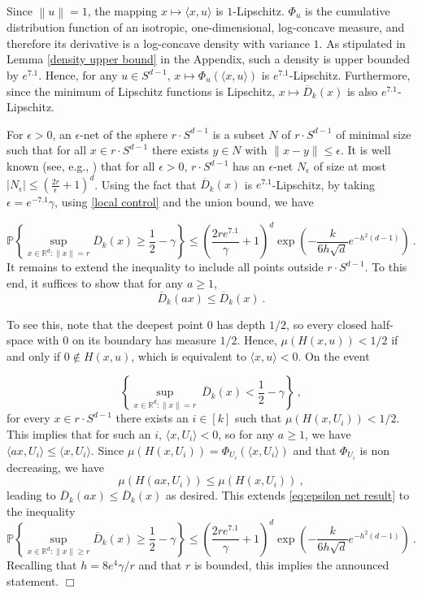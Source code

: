 \documentclass[12pt]{article}
\newcommand{\R}{\mathbb{R}}
\newcommand{\PP}{\mathbb{P}}
\newcommand{\ol}{\overline}
\newcommand{\qed}{\hfill $\Box$}
\newenvironment{proof}{\par\noindent{\bf Proof:}}{\qed \par\medskip\noindent}
\begin{document}
\begin{proof}
Since $\left\|u\right\|=1$, the mapping
$x\mapsto\langle x,u\rangle$ is $1$-Lipschitz. $\Phi_u$ is the
cumulative distribution function of an isotropic, one-dimensional,
log-concave measure, and therefore its derivative is a log-concave
density with variance $1$. As stipulated
in Lemma \ref{density upper bound} in the Appendix, such a density is upper bounded by
$e^{7.1}$. Hence, for any $u\in S^{d-1}$,
$x\mapsto \Phi_u(\langle x, u\rangle)$ is $e^{7.1}$-Lipschitz. Furthermore,
since the minimum of Lipschitz functions is Lipschitz,
$x\mapsto \ol{D}_k(x)$ is also $e^{7.1}$-Lipschitz.

For $\epsilon>0$, an $\epsilon$-net of the sphere $r\cdot S^{d-1}$ is
a subset $N$ of $r\cdot S^{d-1}$
of minimal size such that for all $x\in r\cdot S^{d-1}$ there exists $y \in
N$ with $\|x-y\| \le \epsilon$. It is well known (see, e.g.,
\cite{Mat02}) that for all $\epsilon>0$, $r\cdot S^{d-1}$ has an
$\epsilon$-net $N_{\epsilon}$ of size at most
$|N_{\epsilon}|\le \left(\frac{2r}{\epsilon}+1\right)^d$.
Using the fact that 
$\ol{D}_k(x)$ is $e^{7.1}$-Lipschitz, by taking
$ \epsilon=e^{-7.1}\gamma$,  using \eqref{local control} and the union
bound, we have 

\begin{equation}
  \label{eq:epsilon net result}
 \PP\left\{ \sup_{x\in \R^d: \left\| x\right\| = r} \ol{D}_k(x)  \geq 
   \frac{1}{2}- \gamma \right\}  \leq 
 \left(\frac{2re^{7.1}}{\gamma}+1\right)^d \exp\left(-
            \frac{k}{6h\sqrt{d}} e^{-h^2(d-1)}\right)~.
\end{equation}
It remains to extend the inequality to include all points outside
$r\cdot S^{d-1}$. To this end, it suffices to show that for any $a\geq1$, 
$$\ol{D}_k(a x)\leq \ol{D}_k(x)~.$$
 
To see this, note that the deepest point $0$ has depth $1/2$, so every
closed half-space with $0$ on its boundary has measure
$1/2$. Hence, $\mu(H(x,u))<1/2$ if and
only if $0\notin H(x,u)$, which is equivalent to
$ \langle x,u \rangle < 0 $. On the event

$$\left\{\sup_{x\in\R^d: \left\| x\right\| = r} \ \ol{D}_k(x) <
  \frac{1}{2}-\gamma\right\}~,$$
for every $x\in r\cdot S^{d-1}$ there
exists an $i\in[k]$ such that $\mu(H(x,U_i))<1/2$. This implies that for
such an $i$, $\langle x,U_{i}\rangle < 0$, so for any $a\geq 1$, we have
$\langle a x,U_{i}\rangle \leq \langle x,U_{i} \rangle$. Since
$ \mu(H(x,U_{i}))=\Phi_{U_{i}}(\langle x,U_{i} \rangle)$ and that
$ \Phi_{U_{i}}$ is non decreasing, we have
\[
  \mu(H(a x,U_{i}))\leq \mu(H(x,U_{i}))~, 
\]
leading to $\ol{D}_k(a x) \leq \ol{D}_k(x)$ as desired. This extends
\eqref{eq:epsilon net result} to the inequality
\[
 \PP\left\{ \sup_{x\in \R^d: \left\| x\right\| \ge r} \ol{D}_k(x)  \geq 
   \frac{1}{2}- \gamma \right\}  \leq 
 \left(\frac{2re^{7.1}}{\gamma}+1\right)^d \exp\left(-
            \frac{k}{6h\sqrt{d}} e^{-h^2(d-1)}\right)~.
        \]
Recalling that $h=8e^4\gamma/r$ and that $r$ is bounded, this implies the announced statement.
\end{proof}
\end{document}
